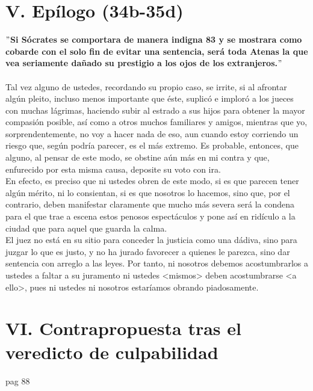\begin{multicols}{2}
\section*{\center V. Epílogo (34b-35d)}
    \textbf{$"$Si Sócrates se comportara de manera indigna 83 y se mostrara como cobarde con el solo fin de evitar una sentencia, será toda Atenas la que vea seriamente dañado su prestigio a los ojos de los extranjeros.$"$}\\\\
    Tal vez alguno de ustedes, recordando su propio caso, se irrite, si al afrontar algún pleito, incluso menos importante que éste, suplicó e imploró a los jueces con muchas lágrimas, haciendo subir al estrado a sus hijos para obtener la mayor compasión posible, así como a otros muchos familiares y amigos, mientras que yo, sorprendentemente, no voy a hacer nada de eso, aun cuando estoy corriendo un riesgo que, según podría parecer, es el más extremo. Es probable, entonces, que alguno, al pensar de este modo, se obstine aún más en mi contra y que, enfurecido por esta misma causa, deposite su voto con ira.\\
    En efecto, es preciso que ni ustedes obren de este modo, si es que parecen tener algún mérito, ni lo consientan, si es que nosotros lo hacemos, sino que, por el contrario, deben manifestar claramente que mucho más severa será la condena para el que trae a escena estos penosos espectáculos y pone así en ridículo a la ciudad que para aquel que guarda la calma.\\
    El juez no está en su sitio para conceder la justicia como una dádiva, sino para juzgar lo que es justo, y no ha jurado favorecer a quienes le parezca, sino dar sentencia con arreglo a las leyes. Por tanto, ni nosotros debemos acostumbrarlos a ustedes a faltar a su juramento ni ustedes <mismos> deben acostumbrarse <a ello>, pues ni ustedes ni nosotros estaríamos obrando piadosamente.

\section*{\center VI. Contrapropuesta tras el veredicto de culpabilidad}
pag 88

\end{multicols}

